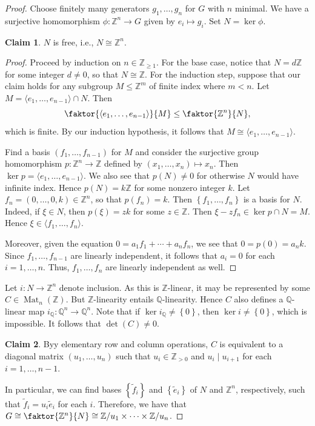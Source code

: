 \documentclass[10pt,letterpaper,cm]{nupset}
\theoremstyle{definition}
\theoremstyle{theorem}
\newtheorem*{claim}{Claim}
\theoremstyle{remark}
\newcommand{\Q}{\mathbb Q}
\newcommand{\Z}{\mathbb Z}
\newcommand{\1}{\mathbf{1}}
\newcommand{\0}{\vec 0}
\DeclareMathOperator{\Mat}{Mat}
\begin{document}
\begin{proof}
Choose finitely many generators $g_1, \ldots, g_n$ for $G$ with $n$ minimal. We have a surjective homomorphism $\phi : \Z^n \to G$ given by $e_i \mapsto g_i$. Set $ N = \ker{\phi}$.
\begin{claim}
$N$ is free, i.e., $N \cong \Z^n$.
\end{claim}
\begin{proof}
Proceed by induction on $n\in \Z_{\geq 1}$. For the base case, notice that  $N = d\Z$ for some integer $d\ne 0$, so that $N \cong \Z$. For the induction step, suppose that our claim holds for any subgroup $M\leq \Z^m$ of finite index where $m<n$. Let $M = \langle e_1, \ldots, e_{n-1}\rangle\cap N$. Then $$\faktor{\langle e_1, \ldots, e_{n-1}\rangle}{M}\leq \faktor{\Z^n}{N},$$ which is finite. By our induction hypothesis, it follows that $M \cong \langle e_1, \ldots, e_{n-1}\rangle$. 

Find a basis $\left(f_1, \ldots, f_{n-1}\right)$ for $M$ and consider the surjective group homomorphism $p : \Z^n \to \Z$ defined by $\left(x_1, \ldots, x_n\right) \mapsto x_n.$ Then $\ker{p} = \langle e_1, \ldots, e_{n-1}\rangle$. We also see that $p(N) \ne 0$ for otherwise $N$ would have infinite index. Hence $p(N) = k\Z$ for some nonzero integer $k$. Let $f_n = \left(0, \ldots, 0, k\right)\in \Z^n$, so that $p(f_n) =k$. Then $\left\{f_1, \ldots, f_n\right\}$ is a basis for $N$. Indeed, if $\xi \in N$, then $p(\xi) = zk$ for some $z\in \Z$. Then $\xi - zf_n \in \ker{p} \cap N = M$. Hence $\xi \in \langle f_1, \ldots, f_n\rangle$. 

Moreover, given the equation $0 = a_1f_1 + \cdots + a_nf_n$, we see that $0= p(0) = a_nk$. Since $f_1, \ldots, f_{n-1}$ are linearly independent, it follows that $a_i= 0$ for each $i=1, \ldots, n$. Thus, $f_1, \ldots, f_n$ are linearly independent as well.
\end{proof}
Let $i : N \to \Z^n$ denote inclusion. As this is $\Z$-linear, it may be represented by some $C\in \Mat_n(\Z)$. But $\Z$-linearity entails $\Q$-linearity. Hence $C$ also defines a $\Q$-linear map $i_{\Q} : \Q^n \to \Q^n$. Note that if $\ker{i_{\Q}} \ne \left\{0\right\}$, then $\ker{i} \ne \left\{0\right\}$, which is impossible. It follows that $\det(C) \ne 0$.

\begin{claim} %
Byy elementary row and column operations, $C$ is equivalent to a diagonal matrix $\left(u_1, \ldots, u_n\right)$ such that  $u_i \in \Z_{>0}$ and $u_i \mid u_{i+1}$ for each $i=1, \ldots, n-1$. 
\end{claim}

 In particular, we can find bases $\left\{\tilde{f}_i\right\}$ and $\left\{\tilde{e}_i\right\}$ of $N$ and $\Z^n$, respectively, such that $ \tilde{f}_i = u_i \tilde{e}_i$ for each $i$. Therefore, we have that $G\cong \faktor{\Z^n}{N} \cong \Z/u_1 \times \cdots \times \Z/u_n$.
\end{proof}
\end{document}
